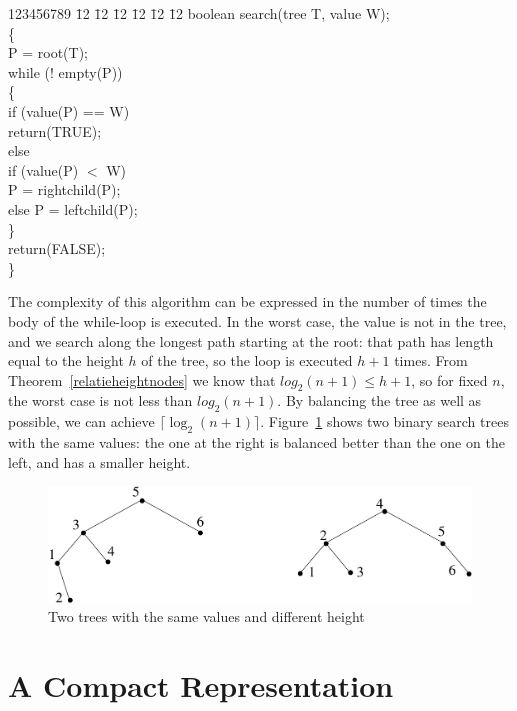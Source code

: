 \parbox{9cm}{
\begin{tabbing}
123456789 \= 12 \= 12 \= 12 \= 12 \= 12 \= 12 \kill
\> boolean search(tree T, value W);\\
\> \{\\
\> \> P = root(T);\\
\> \> while (! empty(P))\\
\> \> \{\\
\> \> \> if (value(P) == W)\\
\> \> \> \> \> return(TRUE);\\
\> \> \> else\\
\> \> \> if (value(P) $<$ W)\\
\> \> \> \> P = rightchild(P);\\
\> \> \> else P = leftchild(P);\\
\> \> \}\\
\> \> return(FALSE);\\
\> \}
\end{tabbing}
}

The complexity of this algorithm can be expressed in the number of
times the body of the while-loop is executed. In the worst case,
the value is not in the tree, and we search along the longest path
starting at the root: that path has length equal to the height $h$ of
the tree, so the loop is executed $h+1$ times. From
Theorem~\ref{relatieheightnodes} we know that $log_2(n+1) \leq h+1$, so
for fixed $n$, the worst case is not less than $log_2(n+1)$. By balancing
the tree as well as possible, we can achieve $\lceil \log_2(n+1)
\rceil$. Figure~\ref{balanced1} shows two binary search trees with the
same values: the one at the right is balanced better than the one on
the left, and has a smaller height.

\begin{figure}[ht]
\begin{center}
\includegraphics[width=0.6\linewidth,keepaspectratio]{balanced1}
\end{center}
\caption{Two trees with the same values and different height \label{balanced1}}
\end{figure}


\section{A Compact Representation}

